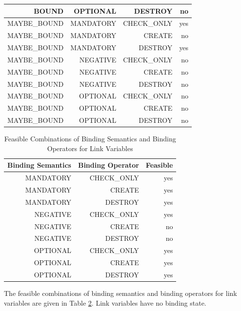 \begin{table}[htbp]
\begin{tabular}{|r|r|r|r|}
    BOUND & OPTIONAL & DESTROY & no \\
    \hline
    MAYBE\_BOUND & MANDATORY & CHECK\_ONLY & yes \\
    MAYBE\_BOUND & MANDATORY & CREATE & no \\
    MAYBE\_BOUND & MANDATORY & DESTROY & yes \\
    MAYBE\_BOUND & NEGATIVE & CHECK\_ONLY & no \\
    MAYBE\_BOUND & NEGATIVE & CREATE & no \\
    MAYBE\_BOUND & NEGATIVE & DESTROY & no \\
    MAYBE\_BOUND & OPTIONAL & CHECK\_ONLY & no \\
    MAYBE\_BOUND & OPTIONAL & CREATE & no \\
    MAYBE\_BOUND & OPTIONAL & DESTROY & no \\
    \hline
    \end{tabular}%
  \label{tab:bindingCombinations}%
\end{table}%



\begin{table}[htbp]
  \centering
  \caption{Feasible Combinations of Binding Semantics and
  Binding Operators for Link Variables}
    \begin{tabular}{|r|r|r|}
    \hline
    \textbf{Binding Semantics} & \textbf{Binding
    Operator} & \textbf{Feasible} \\
    \hline
    MANDATORY & CHECK\_ONLY & yes \\
    MANDATORY & CREATE & yes \\
    MANDATORY & DESTROY & yes \\
    NEGATIVE & CHECK\_ONLY & yes \\
    NEGATIVE & CREATE & no \\
    NEGATIVE & DESTROY & no \\
    OPTIONAL & CHECK\_ONLY & yes \\
    OPTIONAL & CREATE & yes \\
    OPTIONAL & DESTROY & yes \\
    \hline
    \end{tabular}%
  \label{tab:bindingCombinations_links}%
\end{table}%

The feasible combinations of binding semantics and binding operators for link
variables are given in Table \ref{tab:bindingCombinations_links}. Link variables
have no binding state.



